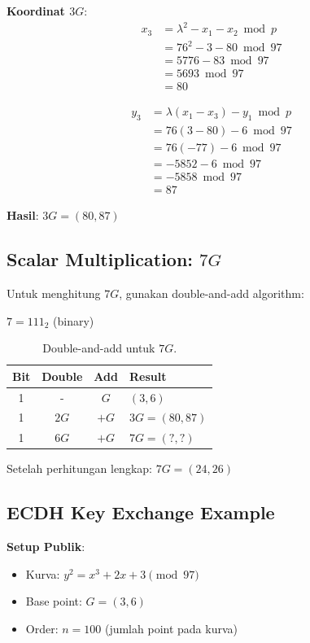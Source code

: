 \textbf{Koordinat $3G$}:
\begin{align*}
x_3 &= \lambda^2 - x_1 - x_2 \bmod p \\
    &= 76^2 - 3 - 80 \bmod 97 \\
    &= 5776 - 83 \bmod 97 \\
    &= 5693 \bmod 97 \\
    &= 80
\end{align*}

\begin{align*}
y_3 &= \lambda(x_1 - x_3) - y_1 \bmod p \\
    &= 76(3 - 80) - 6 \bmod 97 \\
    &= 76(-77) - 6 \bmod 97 \\
    &= -5852 - 6 \bmod 97 \\
    &= -5858 \bmod 97 \\
    &= 87
\end{align*}

\textbf{Hasil}: $3G = (80, 87)$

\subsection{Scalar Multiplication: \texorpdfstring{$7G$}{7G}}

Untuk menghitung $7G$, gunakan double-and-add algorithm:

$7 = 111_2$ (binary)

\begin{table}[htbp]
  \centering
  \small
  \begin{tabular}{cccl}
    \toprule
    \textbf{Bit} & \textbf{Double} & \textbf{Add} & \textbf{Result} \\
    \midrule
    1 & - & $G$ & $(3, 6)$ \\
    1 & $2G$ & $+G$ & $3G = (80, 87)$ \\
    1 & $6G$ & $+G$ & $7G = (?, ?)$ \\
    \bottomrule
  \end{tabular}
  \caption{Double-and-add untuk $7G$.}
\end{table}

Setelah perhitungan lengkap: $7G = (24, 26)$

\subsection{ECDH Key Exchange Example}

\textbf{Setup Publik}:
\begin{itemize}
  \item Kurva: $y^2 = x^3 + 2x + 3 \pmod{97}$
  \item Base point: $G = (3, 6)$
  \item Order: $n = 100$ (jumlah point pada kurva)
\end{itemize}


